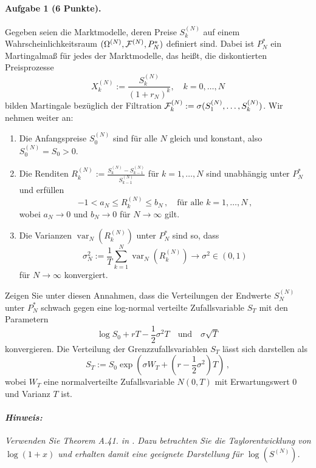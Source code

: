 \documentclass{article}
\begin{document}
\paragraph{Aufgabe 1 \textnormal{(6 Punkte)}.}
Gegeben seien die Marktmodelle, deren Preise $S^{(N)}_k$ auf einem Wahrscheinlichkeitsraum $(\Omega^{(N)},{\cal F}^{(N)},P^*_N)$ definiert sind.
Dabei ist $P^*_N$ ein Martingalmaß für jedes der Marktmodelle, das heißt, die diskontierten Preisprozesse
\[
X^{(N)}_k:=\frac{S^{(N)}_k}{(1+r_N)^k},\quad k=0,\dots,N
\]
bilden Martingale bezüglich der Filtration ${\cal F}^{(N)}_k:=\sigma(S^{(N)}_1,\dots,S^{(N)}_k)$.
Wir nehmen weiter an:
\begin{enumerate}
\item Die Anfangspreise $S^{(N)}_0$ sind für alle $N$ gleich und konstant, also $S_0^{(N)}=S_0>0$.
\item Die Renditen $R^{(N)}_k:=\frac{S^{(N)}_k-S^{(N)}_{k-1}}{S^{(N)}_{k-1}}$ für $k=1,\dots,N$ sind unabhängig unter $P_N^*$ und erfüllen
  \[
    -1<a_N\leq R^{(N)}_k\leq b_N\,,\quad\text{für alle }k=1,\dots,N\,,
  \]
  wobei $a_N\to 0$ und $b_N\to 0$ für $N\to\infty$ gilt.\label{rend}
\item Die Varianzen $\operatorname{var}_N(R^{(N)}_k)$ unter $P^*_N$ sind so, dass
  \[
    \sigma_N^2:=\frac{1}{T}\sum_{k=1}^N\operatorname{var}_N(R^{(N)}_k)\to\sigma^2\in(0,1)
  \]
  für $N\to\infty$ konvergiert.\label{var}
\end{enumerate}
Zeigen Sie unter diesen Annahmen, dass die Verteilungen der Endwerte $S^{(N)}_N$ unter $P^*_N$ schwach gegen eine log-normal verteilte Zufallsvariable $S_T$ mit den Parametern
\[
  \log S_0+rT-\frac{1}{2}\sigma^2T\quad\text{und}\quad \sigma\sqrt{T}
\]
konvergieren.
Die Verteilung der Grenzzufallsvariablen $S_T$ lässt sich darstellen als
\[
  S_T:=S_0\exp\left(\sigma W_T+\left(r-\frac{1}{2}\sigma^2\right)T\right)\,,
\]
wobei $W_T$ eine normalverteilte Zufallsvariable $N(0,T)$ mit Erwartungswert 0 und Varianz $T$ ist.
\paragraph{\textnormal{\textit{Hinweis:}}}
\emph{Verwenden Sie Theorem A.41. in \cite{foellmer2016}.
Dazu betrachten Sie die Taylorentwicklung von $\log(1+x)$ und erhalten damit eine geeignete Darstellung für $\log(S^{(N)})$.}
\end{document}
